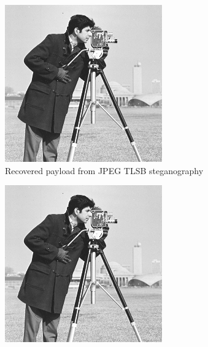 \documentclass{l4proj}
\begin{document}
\begin{figure}
\begin{subfigure}[b]{0.3\textwidth}
        \includegraphics[width=\textwidth]{images/jpeg_steganography_extracted_TLSB.jpeg}
        \caption{Recovered payload from JPEG TLSB steganography}
        \label{fig:jpeg_extracted_TLSB}
    \end{subfigure}
    \begin{subfigure}[b]{0.3\textwidth}
        \includegraphics[width=\textwidth]{images/jpeg_steganography_extracted_TLSBRandom.jpeg}

\end{subfigure}
\end{figure}
\end{document}
